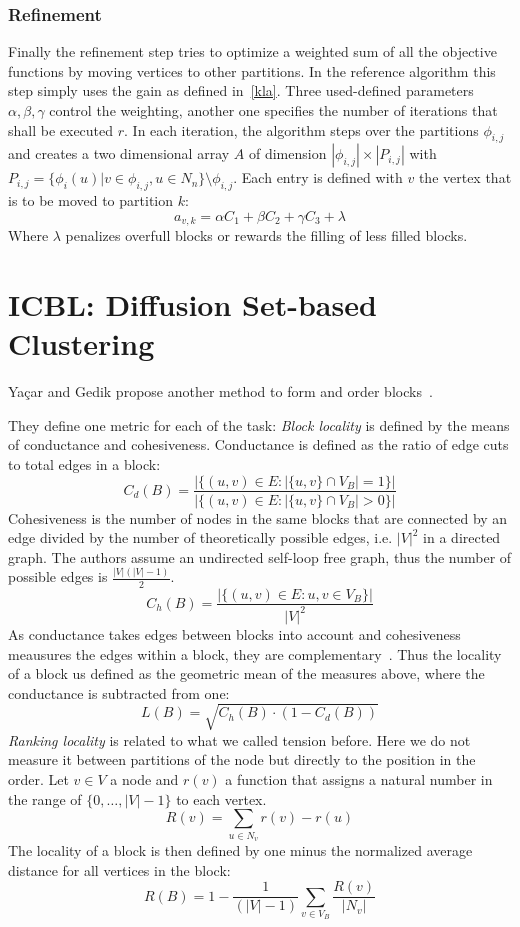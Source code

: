         \subsubsection*{Refinement}
        Finally the refinement step tries to optimize a weighted sum of all the objective functions by moving vertices to other partitions.
        In the reference algorithm this step simply uses the gain as defined in~\ref{kla}.
        Three used-defined parameters $\alpha, \beta, \gamma$ control the weighting, another one specifies the number of iterations that shall be executed $r$.
        In each iteration, the algorithm steps over the partitions $\phi_{i,j}$ and creates a two dimensional array $A$ of dimension $|\phi_{i,j}| \times |P_{i,j}|$ with $P_{i,j} = \{ \phi_i(u) | v \in \phi_{i,j}, u \in N_n\} \setminus \phi_{i,j}$.
        Each entry is defined with $v$ the vertex that is to be moved to partition $k$:
        \[ a_{v,k} = \alpha C_1 + \beta C_2 + \gamma C_3 + \lambda \]
        Where $\lambda$ penalizes overfull blocks or rewards the filling of less filled blocks.


    
\section{ICBL: Diffusion Set-based Clustering}
    Ya\c{c}ar and Gedik propose another method to form and order blocks~\autocite{yacsar2015scalable, yacsar2017distributed}. 
        
    They define one metric for each of the task:
    \textit{Block locality} is defined by the means of conductance and cohesiveness. 
    Conductance is defined as the ratio of edge cuts to total edges in a block:
    \[ C_d (B) = \frac{|\{ (u,v) \in E: |\{u,v\} \cap V_B| = 1\}|}{|\{ (u,v) \in E: |\{u,v\} \cap V_B| > 0\}|} \]
    Cohesiveness is the number of nodes in the same blocks that are connected by an edge divided by the number of theoretically possible edges, i.e. $|V|^2$ in a directed graph. The authors assume an undirected self-loop free graph, thus the number of possible edges is $\frac{|V| (|V| - 1)}{2}$.
    \[ C_h (B) = \frac{|\{ (u,v) \in E: u,v \in V_B \}|}{|V|^2} \]
    As conductance takes edges between blocks into account and cohesiveness meausures the edges within a block, they are complementary~\autocite{yacsar2015scalable}.
    Thus the locality of a block us defined as the geometric mean of the measures above, where the conductance is subtracted from one:
    \[ L(B) = \sqrt{C_h (B) \cdot (1 - C_d (B))} \]
    \textit{Ranking locality} is related to what we called tension before. 
    Here we do not measure it between partitions of the node but directly to the position in the order. 
    Let $v \in V$ a node and $r(v)$ a function that assigns a natural number in the range of $\{0, \dots, |V|-1\}$ to each vertex.
    \[ R (v) = \sum_{u \in N_v} r(v) - r(u) \]
    The locality of a block is then defined by one minus the normalized average distance for all vertices in the block:
    \[ R(B) = 1 - \frac{1}{(|V| - 1)} \sum_{v \in V_B} \frac{R(v)}{|N_v|} \]
    
